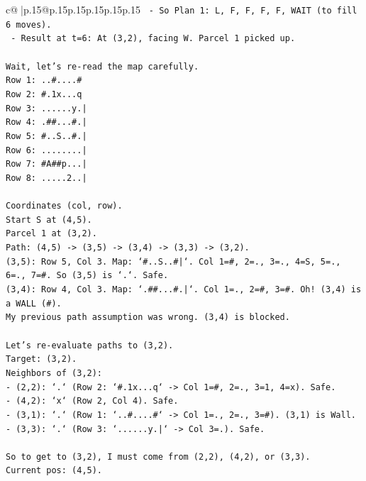 \documentclass{article}
\begin{document}
{\begin{supertabular}{c@{$\;$}|p{.15\linewidth}@{}p{.15\linewidth}p{.15\linewidth}p{.15\linewidth}p{.15\linewidth}p{.15\linewidth}}
{{{\texttt{      {-} So Plan 1: L, F, F, F, F, WAIT (to fill 6 moves).} \\
\texttt{      {-} Result at t=6: At (3,2), facing W. Parcel 1 picked up.} \\
\\ 
\texttt{Wait, let's re{-}read the map carefully.} \\
\texttt{Row 1: ..\#....\#} \\
\texttt{Row 2: \#.1x...q} \\
\texttt{Row 3: ......y.|} \\
\texttt{Row 4: .\#\#...\#.|} \\
\texttt{Row 5: \#..S..\#.|} \\
\texttt{Row 6: ........|} \\
\texttt{Row 7: \#A\#\#p...|} \\
\texttt{Row 8: .....2..|} \\
\\ 
\texttt{Coordinates (col, row).} \\
\texttt{Start S at (4,5).} \\
\texttt{Parcel 1 at (3,2).} \\
\texttt{Path: (4,5) {-}> (3,5) {-}> (3,4) {-}> (3,3) {-}> (3,2).} \\
\texttt{(3,5): Row 5, Col 3. Map: `\#..S..\#|`. Col 1=\#, 2=., 3=., 4=S, 5=., 6=., 7=\#. So (3,5) is `.`. Safe.} \\
\texttt{(3,4): Row 4, Col 3. Map: `.\#\#...\#.|`. Col 1=., 2=\#, 3=\#. Oh! (3,4) is a WALL (\#).} \\
\texttt{My previous path assumption was wrong. (3,4) is blocked.} \\
\\ 
\texttt{Let's re{-}evaluate paths to (3,2).} \\
\texttt{Target: (3,2).} \\
\texttt{Neighbors of (3,2):} \\
\texttt{{-} (2,2): `.` (Row 2: `\#.1x...q` {-}> Col 1=\#, 2=., 3=1, 4=x). Safe.} \\
\texttt{{-} (4,2): `x` (Row 2, Col 4). Safe.} \\
\texttt{{-} (3,1): `.` (Row 1: `..\#....\#` {-}> Col 1=., 2=., 3=\#). (3,1) is Wall.} \\
\texttt{{-} (3,3): `.` (Row 3: `......y.|` {-}> Col 3=.). Safe.} \\
\\ 
\texttt{So to get to (3,2), I must come from (2,2), (4,2), or (3,3).} \\
\texttt{Current pos: (4,5).} \\
}}}
\end{supertabular}}
\end{document}
